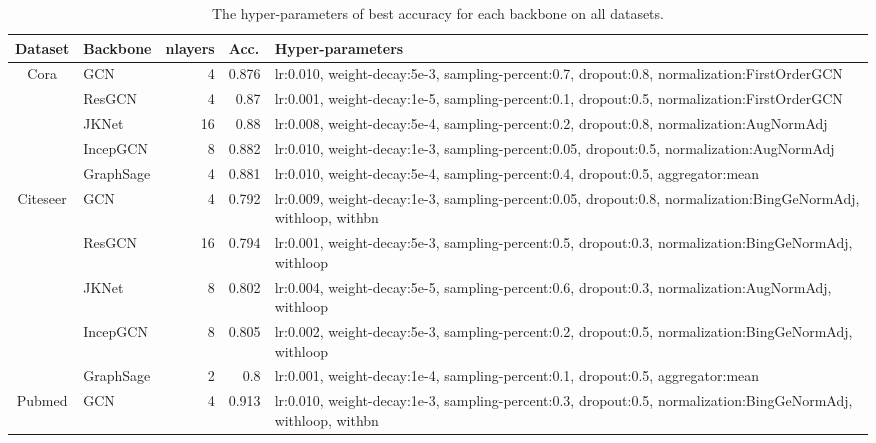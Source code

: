 \documentclass{article}
\begin{document}
\begin{table}[p]
  \centering
  \caption{The hyper-parameters of best accuracy for each backbone on all datasets.}
  \vspace{-2ex}
    \small
    \begin{tabular}{cl|r|r|p{}}
    \hline
    \multicolumn{1}{l}{Dataset} & Backbone & \multicolumn{1}{l|}{nlayers} & \multicolumn{1}{l|}{Acc.} & Hyper-parameters \\
    \hline
    \multirow{5}[10]{*}{Cora} & GCN   & 4     & 0.876 & lr:0.010, weight-decay:5e-3, sampling-percent:0.7, dropout:0.8, normalization:FirstOrderGCN \\
\cline{2-5}          & ResGCN & 4     & 0.87  & lr:0.001, weight-decay:1e-5, sampling-percent:0.1, dropout:0.5, normalization:FirstOrderGCN \\
\cline{2-5}          & JKNet & 16    & 0.88  & lr:0.008, weight-decay:5e-4, sampling-percent:0.2, dropout:0.8, normalization:AugNormAdj \\
\cline{2-5}          & IncepGCN & 8     & 0.882 & lr:0.010, weight-decay:1e-3, sampling-percent:0.05, dropout:0.5, normalization:AugNormAdj \\
\cline{2-5}          & GraphSage & 4     & 0.881 &  lr:0.010, weight-decay:5e-4, sampling-percent:0.4, dropout:0.5, aggregator:mean \\
    \hline
    \multirow{5}[10]{*}{Citeseer} & GCN   & 4     & 0.792 & lr:0.009, weight-decay:1e-3, sampling-percent:0.05, dropout:0.8, normalization:BingGeNormAdj, withloop, withbn \\
\cline{2-5}          & ResGCN & 16    & 0.794 &  lr:0.001, weight-decay:5e-3, sampling-percent:0.5, dropout:0.3, normalization:BingGeNormAdj, withloop \\
\cline{2-5}          & JKNet & 8     & 0.802 &  lr:0.004, weight-decay:5e-5, sampling-percent:0.6, dropout:0.3, normalization:AugNormAdj, withloop \\
\cline{2-5}          & IncepGCN & 8     & 0.805 &  lr:0.002, weight-decay:5e-3, sampling-percent:0.2, dropout:0.5, normalization:BingGeNormAdj, withloop \\
\cline{2-5}          & GraphSage & 2     & 0.8   & lr:0.001, weight-decay:1e-4, sampling-percent:0.1, dropout:0.5, aggregator:mean \\
    \hline
    \multirow{5}[10]{*}{Pubmed} & GCN   & 4     & 0.913 & lr:0.010, weight-decay:1e-3, sampling-percent:0.3, dropout:0.5, normalization:BingGeNormAdj, withloop, withbn \\

\end{tabular}
\end{table}
\end{document}
